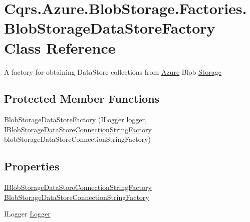 \hypertarget{classCqrs_1_1Azure_1_1BlobStorage_1_1Factories_1_1BlobStorageDataStoreFactory}{}\section{Cqrs.\+Azure.\+Blob\+Storage.\+Factories.\+Blob\+Storage\+Data\+Store\+Factory Class Reference}
\label{classCqrs_1_1Azure_1_1BlobStorage_1_1Factories_1_1BlobStorageDataStoreFactory}


A factory for obtaining Data\+Store collections from \hyperlink{namespaceCqrs_1_1Azure}{Azure} Blob \hyperlink{namespaceCqrs_1_1Azure_1_1Storage}{Storage}  


\subsection*{Protected Member Functions}
\begin{DoxyCompactItemize}
\item 
\hyperlink{classCqrs_1_1Azure_1_1BlobStorage_1_1Factories_1_1BlobStorageDataStoreFactory_a448e77623db63d7a66fc6b6c75466eac}{Blob\+Storage\+Data\+Store\+Factory} (I\+Logger logger, \hyperlink{interfaceCqrs_1_1Azure_1_1BlobStorage_1_1DataStores_1_1IBlobStorageDataStoreConnectionStringFactory}{I\+Blob\+Storage\+Data\+Store\+Connection\+String\+Factory} blob\+Storage\+Data\+Store\+Connection\+String\+Factory)
\end{DoxyCompactItemize}
\subsection*{Properties}
\begin{DoxyCompactItemize}
\item 
\hyperlink{interfaceCqrs_1_1Azure_1_1BlobStorage_1_1DataStores_1_1IBlobStorageDataStoreConnectionStringFactory}{I\+Blob\+Storage\+Data\+Store\+Connection\+String\+Factory} \hyperlink{classCqrs_1_1Azure_1_1BlobStorage_1_1Factories_1_1BlobStorageDataStoreFactory_a5df6d152d265ee439183ef60b3deb666}{Blob\+Storage\+Data\+Store\+Connection\+String\+Factory}
\item 
I\+Logger \hyperlink{classCqrs_1_1Azure_1_1BlobStorage_1_1Factories_1_1BlobStorageDataStoreFactory_a18a5d0c661d5fd43c075a7c926aedf0f}{Logger}
\end{DoxyCompactItemize}


